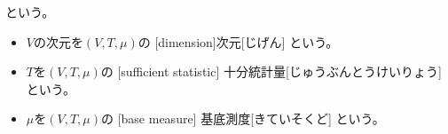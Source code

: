 \documentclass[report]{jlreq}
\begin{document}
\begin{definition}[指数型分布族]
\begin{itemize}
            という。
            \begin{itemize}
                \item $V$の次元を$(V, T, \mu)$の
                    [dimension]{次元}[じげん]
                    という。
                \item $T$を$(V, T, \mu)$の
                    [sufficient statistic]
                    {十分統計量}[じゅうぶんとうけいりょう]
                    という。
                \item $\mu$を$(V, T, \mu)$の
                    [base measure]
                    {基底測度}[きていそくど]
                    という。
            \end{itemize}
    \end{itemize}
\end{definition}
\end{document}
